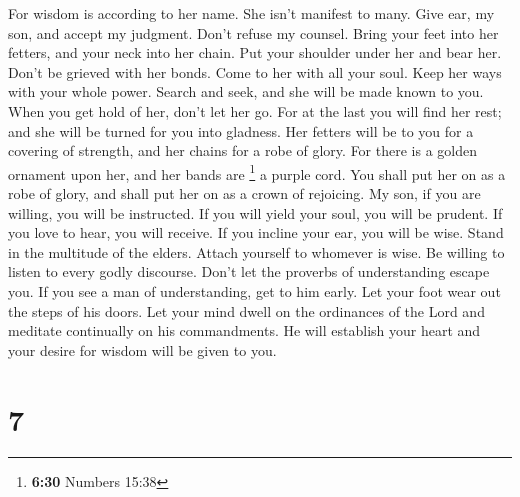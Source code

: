  For wisdom is according to her name. She isn't manifest
to many.  Give ear, my son, and accept my judgment. Don't
refuse my counsel.  Bring your feet into her fetters, and
your neck into her chain.  Put your shoulder under her
and bear her. Don't be grieved with her bonds.  Come to
her with all your soul. Keep her ways with your whole power.
 Search and seek, and she will be made known to you. When
you get hold of her, don't let her go.  For at the last
you will find her rest; and she will be turned for you into gladness.
 Her fetters will be to you for a covering of strength,
and her chains for a robe of glory.  For there is a
golden ornament upon her, and her bands are \footnote{\textbf{6:30}
  Numbers 15:38} a purple cord.  You shall put her on as
a robe of glory, and shall put her on as a crown of rejoicing.
 My son, if you are willing, you will be instructed. If
you will yield your soul, you will be prudent.  If you
love to hear, you will receive. If you incline your ear, you will be
wise.  Stand in the multitude of the elders. Attach
yourself to whomever is wise.  Be willing to listen to
every godly discourse. Don't let the proverbs of understanding escape
you.  If you see a man of understanding, get to him
early. Let your foot wear out the steps of his doors. 
Let your mind dwell on the ordinances of the Lord and meditate
continually on his commandments. He will establish your heart and your
desire for wisdom will be given to you.

\hypertarget{section-5}{%
\section{7}\label{section-5}}

